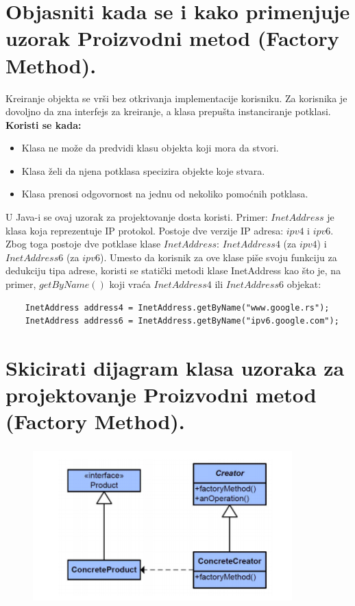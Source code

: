 \documentclass[a4paper]{article}
\begin{document}
\section{Objasniti kada se i kako primenjuje uzorak Proizvodni metod (Factory Method).}
  Kreiranje objekta se vrši bez otkrivanja implementacije korisniku. Za korisnika je dovoljno
  da zna interfejs za kreiranje, a klasa prepušta instanciranje potklasi. \\
  \textbf{Koristi se kada:}
  \begin{itemize}
    \item Klasa ne može da predvidi klasu objekta koji mora da stvori.
    \item Klasa želi da njena potklasa specizira objekte koje stvara.
    \item Klasa prenosi odgovornost na jednu od nekoliko pomoćnih potklasa.
  \end{itemize}
  \indent U Java-i se ovaj uzorak za projektovanje dosta koristi. Primer: $InetAddress$ je klasa koja
  reprezentuje IP protokol. Postoje dve verzije IP adresa: $ipv4$ i $ipv6$. Zbog toga postoje
  dve potklase klase $InetAddress$: $InetAddress4$ (za $ipv4$) i $InetAddress6$ (za $ipv6$). Umesto
  da korisnik za ove klase piše svoju funkciju za dedukciju tipa adrese, koristi se 
  statički metodi klase InetAddress kao što je, na primer, $getByName()$ koji vraća $InetAddress4$
  ili $InetAddress6$ objekat:
  \begin{lstlisting}
    InetAddress address4 = InetAddress.getByName("www.google.rs");
    InetAddress address6 = InetAddress.getByName("ipv6.google.com");\end{lstlisting}

\section{Skicirati dijagram klasa uzoraka za projektovanje Proizvodni metod (Factory Method).}
  \begin{figure}[H]
    \begin{center}
        \includegraphics[width=100mm,height=60mm]{Slike/dp_factory_method.png}
    \end{center}
  \end{figure} 
\end{document}
